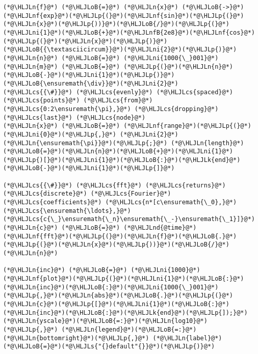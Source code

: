 \documentclass[12pt,a4paper]{article}
\newcommand{\HLJLk}[1]{\textcolor[RGB]{148,91,176}{\textbf{#1}}}
\newcommand{\HLJLn}[1]{#1}
\newcommand{\HLJLnd}[1]{\textcolor[RGB]{214,102,97}{#1}}
\newcommand{\HLJLnf}[1]{\textcolor[RGB]{66,102,213}{#1}}
\newcommand{\HLJLs}[1]{\textcolor[RGB]{201,61,57}{#1}}
\newcommand{\HLJLnfB}[1]{\textcolor[RGB]{59,151,46}{#1}}
\newcommand{\HLJLni}[1]{\textcolor[RGB]{59,151,46}{#1}}
\newcommand{\HLJLoB}[1]{\textcolor[RGB]{102,102,102}{\textbf{#1}}}
\newcommand{\HLJLp}[1]{#1}
\newcommand{\HLJLcs}[1]{\textcolor[RGB]{153,153,119}{\textit{#1}}}
\begin{document}
\begin{lstlisting}
(*@\HLJLn{f}@*) (*@\HLJLoB{=}@*) (*@\HLJLn{x}@*) (*@\HLJLoB{->}@*) (*@\HLJLnf{exp}@*)(*@\HLJLp{(}@*)(*@\HLJLnf{sin}@*)(*@\HLJLp{(}@*)(*@\HLJLn{x}@*)(*@\HLJLp{))}@*)(*@\HLJLoB{/}@*)(*@\HLJLp{(}@*)(*@\HLJLni{1}@*)(*@\HLJLoB{+}@*)(*@\HLJLnfB{2e8}@*)(*@\HLJLnf{cos}@*)(*@\HLJLp{(}@*)(*@\HLJLn{x}@*)(*@\HLJLp{)}@*)(*@\HLJLoB{{\textasciicircum}}@*)(*@\HLJLni{2}@*)(*@\HLJLp{)}@*)
(*@\HLJLn{n}@*) (*@\HLJLoB{=}@*) (*@\HLJLni{1000{\_}001}@*)
(*@\HLJLn{m}@*) (*@\HLJLoB{=}@*) (*@\HLJLp{(}@*)(*@\HLJLn{n}@*)(*@\HLJLoB{-}@*)(*@\HLJLni{1}@*)(*@\HLJLp{)}@*)(*@\HLJLoB{\ensuremath{\div}}@*)(*@\HLJLni{2}@*)
(*@\HLJLcs{{\#}}@*) (*@\HLJLcs{evenly}@*) (*@\HLJLcs{spaced}@*) (*@\HLJLcs{points}@*) (*@\HLJLcs{from}@*) (*@\HLJLcs{0:2\ensuremath{\pi},}@*) (*@\HLJLcs{dropping}@*) (*@\HLJLcs{last}@*) (*@\HLJLcs{node}@*)
(*@\HLJLn{x}@*) (*@\HLJLoB{=}@*) (*@\HLJLnf{range}@*)(*@\HLJLp{(}@*)(*@\HLJLni{0}@*)(*@\HLJLp{,}@*) (*@\HLJLni{2}@*)(*@\HLJLn{\ensuremath{\pi}}@*)(*@\HLJLp{;}@*) (*@\HLJLn{length}@*)(*@\HLJLoB{=}@*)(*@\HLJLn{n}@*)(*@\HLJLoB{+}@*)(*@\HLJLni{1}@*)(*@\HLJLp{)[}@*)(*@\HLJLni{1}@*)(*@\HLJLoB{:}@*)(*@\HLJLk{end}@*)(*@\HLJLoB{-}@*)(*@\HLJLni{1}@*)(*@\HLJLp{]}@*)

(*@\HLJLcs{{\#}}@*) (*@\HLJLcs{fft}@*) (*@\HLJLcs{returns}@*) (*@\HLJLcs{discrete}@*) (*@\HLJLcs{Fourier}@*) (*@\HLJLcs{coefficients}@*) (*@\HLJLcs{n*[c\ensuremath{\_0},}@*) (*@\HLJLcs{\ensuremath{\ldots},}@*) (*@\HLJLcs{c{\_}\ensuremath{\_n}\ensuremath{\_-}\ensuremath{\_1}]}@*)
(*@\HLJLn{c}@*) (*@\HLJLoB{=}@*) (*@\HLJLnd{@time}@*) (*@\HLJLnf{fft}@*)(*@\HLJLp{(}@*)(*@\HLJLn{f}@*)(*@\HLJLoB{.}@*)(*@\HLJLp{(}@*)(*@\HLJLn{x}@*)(*@\HLJLp{))}@*)(*@\HLJLoB{/}@*)(*@\HLJLn{n}@*)

(*@\HLJLn{inc}@*) (*@\HLJLoB{=}@*) (*@\HLJLni{1000}@*)
(*@\HLJLnf{plot}@*)(*@\HLJLp{(}@*)(*@\HLJLni{1}@*)(*@\HLJLoB{:}@*)(*@\HLJLn{inc}@*)(*@\HLJLoB{:}@*)(*@\HLJLni{1000{\_}001}@*)(*@\HLJLp{,}@*)(*@\HLJLn{abs}@*)(*@\HLJLoB{.}@*)(*@\HLJLp{(}@*)(*@\HLJLn{c}@*)(*@\HLJLp{[}@*)(*@\HLJLni{1}@*)(*@\HLJLoB{:}@*)(*@\HLJLn{inc}@*)(*@\HLJLoB{:}@*)(*@\HLJLk{end}@*)(*@\HLJLp{]);}@*) (*@\HLJLn{yscale}@*)(*@\HLJLoB{=:}@*)(*@\HLJLn{log10}@*)(*@\HLJLp{,}@*) (*@\HLJLn{legend}@*)(*@\HLJLoB{=:}@*)(*@\HLJLn{bottomright}@*)(*@\HLJLp{,}@*) (*@\HLJLn{label}@*)(*@\HLJLoB{=}@*)(*@\HLJLs{"{}default"{}}@*)(*@\HLJLp{)}@*)


\end{lstlisting}
\end{document}
